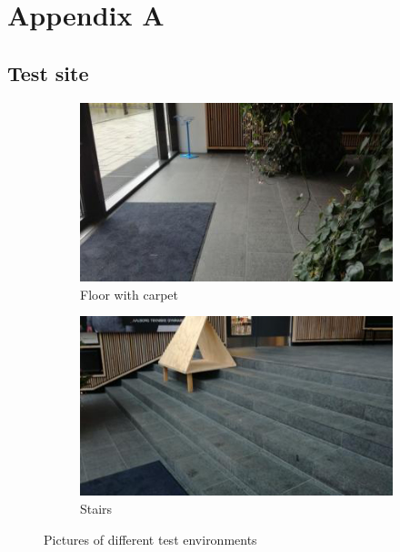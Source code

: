 \chapter{Appendix A}
\section{Test site}\label{ch:testSite}
\begin{figure}[h]
\centering
    \begin{subfigure}{.49\textwidth}
        \centering
        \includegraphics[width=\textwidth]{figures/testarea1.jpg}
        \caption{Floor with carpet}
        \label{fig:testsite1} 
    \end{subfigure}
    \begin{subfigure}{.49\textwidth}
        \centering
        \includegraphics[width=\textwidth]{figures/testarea2.jpg} 
        \caption{Stairs}
        \label{fig:testsite2}
    \end{subfigure}
\caption{Pictures of different test environments}
\label{fig:testsite12}
\end{figure}

